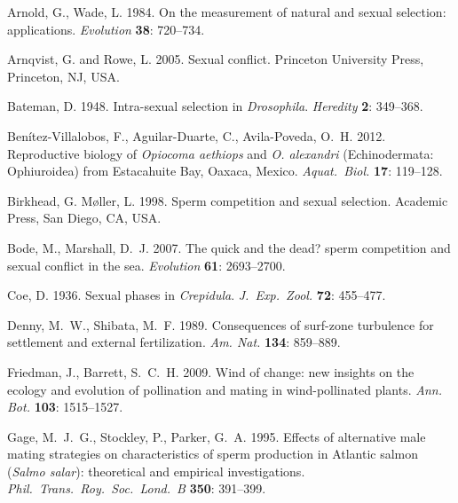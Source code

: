\documentclass{article}
\begin{document}
\begin{thebibliography}{}

Arnold, G., Wade, L. 1984.
\newblock On the measurement of natural and sexual selection: applications.
\newblock \textit{Evolution} \textbf{38}: 720--734.

Arnqvist, G. and Rowe, L. 2005.
\newblock Sexual conflict.
\newblock Princeton University Press, Princeton, NJ, USA.

Bateman, D. 1948.
\newblock Intra-sexual selection in \textit{Drosophila}.
\newblock \textit{Heredity} \textbf{2}: 349--368.

Ben\'{i}tez-Villalobos, F., Aguilar-Duarte, C., Avila-Poveda, O.~H. 2012.
\newblock Reproductive biology of \textit{Opiocoma aethiops} and \textit{O. alexandri} (Echinodermata: Ophiuroidea) from Estacahuite Bay, Oaxaca, Mexico.
\newblock \textit{Aquat.~Biol.} \textbf{17}: 119--128.

Birkhead, G. M{\o}ller, L. 1998.
\newblock Sperm competition and sexual selection.
\newblock Academic Press, San Diego, CA, USA.

Bode, M., Marshall, D.~J. 2007.
\newblock The quick and the dead? sperm competition and sexual conflict in the sea.
\newblock \textit{Evolution} \textbf{61}: 2693--2700.

Coe, D. 1936.
\newblock Sexual phases in \textit{Crepidula}.
\newblock \textit{J.~Exp.~Zool.} \textbf{72}: 455--477.

Denny, M.~W., Shibata, M.~F. 1989.
\newblock Consequences of surf-zone turbulence for settlement and external fertilization.
\newblock \textit{Am. Nat.} \textbf{134}: 859--889.

Friedman, J., Barrett, S.~C.~H. 2009.
\newblock Wind of change: new insights on the ecology and evolution of pollination and mating in wind-pollinated plants.
\newblock \textit{Ann. Bot.} \textbf{103}: 1515--1527.

Gage, M.~J.~G., Stockley, P., Parker, G.~A. 1995.
\newblock Effects of alternative male mating strategies on characteristics of sperm production in Atlantic salmon (\textit{Salmo salar}): theoretical and empirical investigations.
\newblock \textit{Phil.~Trans.~Roy.~Soc.~Lond.~B} \textbf{350}: 391--399.


\end{thebibliography}
\end{document}
